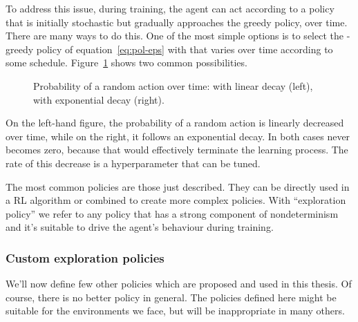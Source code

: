 To address this issue, during training, the agent can act according to a
policy that is initially stochastic but gradually approaches the greedy
policy, over time. There are many ways to do this. One of the most simple
options is to select the \eps{}-greedy policy of equation~\eqref{eq:pol-eps}
with \eps{} that varies over time according to some schedule.
Figure~\ref{fig:policy-schedules} shows two common possibilities.
\begin{figure}
	\centering
	\qquad
	\caption{Probability of a random action over time: \eps{} with linear decay
	(left), \eps{} with exponential decay (right).}
	\label{fig:policy-schedules}
\end{figure}
On the left-hand figure, the probability of a random action is linearly
decreased over time, while on the right, it follows an exponential decay. In
both cases \eps{} never becomes zero, because that would effectively terminate
the learning process. The rate of this decrease is a hyperparameter that
can be tuned.

The most common policies are those just described. They can be directly
used in a RL algorithm or combined to create more complex policies. With
``exploration policy'' we refer to any policy that has a strong component of
nondeterminism and it's suitable to drive the agent's behaviour during
training.


\subsubsection*{Custom exploration policies}


We'll now define few other policies which are proposed and used in this
thesis.  Of course, there is no better policy in general. The policies defined
here might be suitable for the environments we face, but will be inappropriate
in many others.

